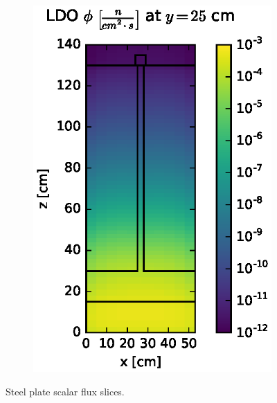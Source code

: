 \documentclass{article} %
\begin{document}
\begin{figure}[!htb]
\begin{subfigure}{0.4\textwidth}
\includegraphics[max height=0.445\textheight]
{steel-fwd-flux-ldo11.eps}
\end{subfigure}
\caption{Steel plate scalar flux slices.}
\label{steel-fwd-slices}
\end{figure}
\end{document}
